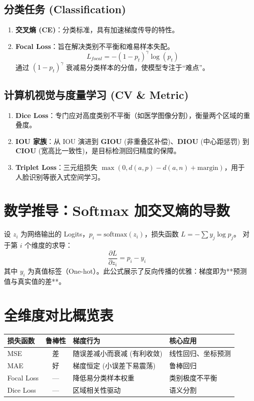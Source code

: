 \documentclass[12pt, a4paper]{article}
\begin{document}
\subsection{分类任务 (Classification)}
\begin{enumerate}
    \item \textbf{交叉熵 (CE)}：分类标准，具有加速梯度传导的特性。
    \item \textbf{Focal Loss}：旨在解决类别不平衡和难易样本失配。
    $$ L_{focal} = -(1 - p_t)^\gamma \log(p_t) $$
    通过 $(1-p_t)^\gamma$ 衰减易分类样本的分值，使模型专注于“难点”。
\end{enumerate}

\subsection{计算机视觉与度量学习 (CV \& Metric)}
\begin{enumerate}
    \item \textbf{Dice Loss}：专门应对高度类别不平衡（如医学图像分割），衡量两个区域的重叠度。
    \item \textbf{IOU 家族}：从 IOU 演进到 \textbf{GIOU} (非重叠区补偿)、\textbf{DIOU} (中心距惩罚) 到 \textbf{CIOU} (宽高比一致性)，是目标检测回归精度的保障。
    \item \textbf{Triplet Loss}：三元组损失 $\max(0, d(a,p) - d(a,n) + \text{margin})$，用于人脸识别等嵌入式空间学习。
\end{enumerate}

\section{数学推导：Softmax 加交叉熵的导数}
设 $z_i$ 为网络输出的 Logits，$p_i = \text{softmax}(z_i)$，损失函数 $L = -\sum y_j \log p_j$。
对于第 $i$ 个维度的求导：
$$ \frac{\partial L}{\partial z_i} = p_i - y_i $$
其中 $y_i$ 为真值标签（One-hot）。此公式展示了反向传播的优雅：梯度即为**预测值与真实值的差**。

\section{全维度对比概览表}
\begin{table}[h]
\centering
\small
\begin{tabularx}{\textwidth}{|l|c|X|l|}
\hline
\textbf{损失函数} & \textbf{鲁棒性} & \textbf{梯度行为} & \textbf{核心应用} \\
\hline
MSE & 差 & 随误差减小而衰减 (有利收敛) & 线性回归、坐标预测 \\
\hline
MAE & 好 & 梯度恒定 (小误差下易震荡) & 鲁棒回归 \\
\hline
Focal Loss & --- & 降低易分类样本权重 & 类别极度不平衡 \\
\hline
Dice Loss & --- & 区域相关性驱动 & 语义分割 \\
\hline
\end{tabularx}
\end{table}
\end{document}
